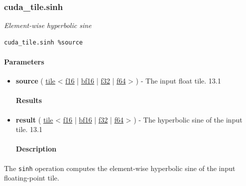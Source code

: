 \documentclass{article}
\begin{document}
\subsubsection{cuda\_tile.sinh}

\textit{Element-wise hyperbolic sine}


\begin{lstlisting}
cuda_tile.sinh %source
\end{lstlisting}

\paragraph{Parameters}

\begin{itemize}
\item \textbf{source} ( \href{https://docs.nvidia.com/cuda/tile-ir/latest/sections/types.html#type-tile}{tile} < \href{https://docs.nvidia.com/cuda/tile-ir/latest/sections/types.html#subsection-element-types}{f16} | \href{https://docs.nvidia.com/cuda/tile-ir/latest/sections/types.html#subsection-element-types}{bf16} | \href{https://docs.nvidia.com/cuda/tile-ir/latest/sections/types.html#subsection-element-types}{f32} | \href{https://docs.nvidia.com/cuda/tile-ir/latest/sections/types.html#subsection-element-types}{f64} > ) - The input float tile. 13.1


\paragraph{Results}

\item \textbf{result} ( \href{https://docs.nvidia.com/cuda/tile-ir/latest/sections/types.html#type-tile}{tile} < \href{https://docs.nvidia.com/cuda/tile-ir/latest/sections/types.html#subsection-element-types}{f16} | \href{https://docs.nvidia.com/cuda/tile-ir/latest/sections/types.html#subsection-element-types}{bf16} | \href{https://docs.nvidia.com/cuda/tile-ir/latest/sections/types.html#subsection-element-types}{f32} | \href{https://docs.nvidia.com/cuda/tile-ir/latest/sections/types.html#subsection-element-types}{f64} > ) - The hyperbolic sine of the input tile. 13.1


\paragraph{Description}

\end{itemize}
The \texttt{sinh} operation computes the element-wise hyperbolic sine of the input floating-point tile.
\end{document}

